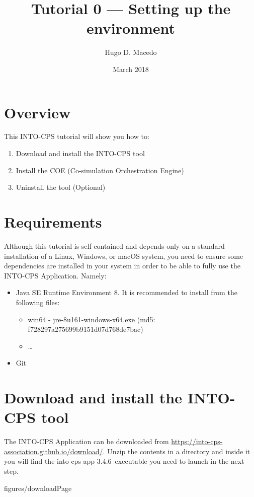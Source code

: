 \documentclass[11pt,a4paper]{../tutorial}
\title{Tutorial 0 --- Setting up the environment}
\date{March 2018}
\author{Hugo D. Macedo}
\def\intocpsVer{3.4.6}
\begin{document}
\section*{Overview}

This INTO-CPS tutorial will show you how to:

\begin{enumerate}[noitemsep]
\item Download and install the INTO-CPS tool
\item Install the COE (Co-simulation Orchestration Engine)
\item Uninstall the tool (Optional) 
\end{enumerate}

\section*{Requirements}

Although this tutorial is self-contained and depends only on a standard
installation of a Linux, Windows, or macOS system, you need to ensure some
dependencies are installed in your system in order to be able to fully use the
INTO-CPS Application. Namely: 

\begin{itemize}[noitemsep]
\item Java SE Runtime Environment 8. It is recommended to install from the following files: 
	\begin{itemize}
	\item win64 - jre-8u161-windows-x64.exe (md5: f728297a275699b9151d07d768de7bac) 
	\item \ldots
	\end{itemize}
\item Git
\end{itemize}


\section{Download and install the INTO-CPS tool}


\begin{instructions} 

\item The INTO-CPS Application can be downloaded from
	\url{https://into-cps-association.github.io/download/}. Unzip the
	contents in a directory and inside it you will find the into-cps-app-\intocpsVer\
	executable you need to launch in the next step. 
	
	\begin{annotation}[width=0.85\linewidth]{figures/downloadPage}
	\end{annotation}

\end{instructions}
\end{document}
